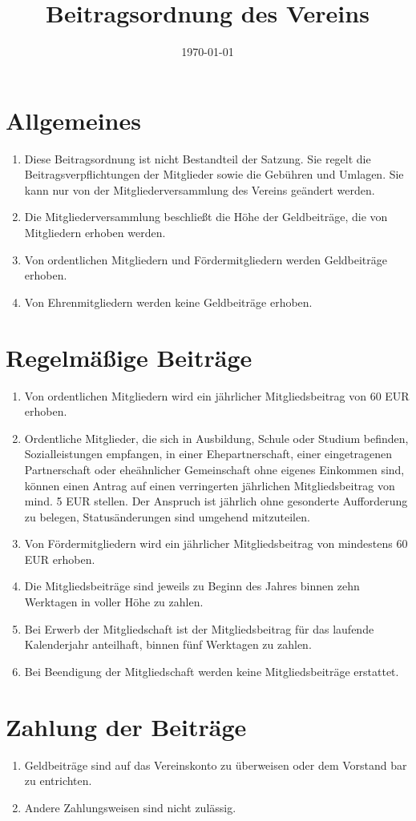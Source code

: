 \documentclass[12pt,a4paper,draft]{article}
\title{Beitragsordnung des Vereins \unsername}
\author{\unsername}
\date{\today}
\begin{document}
\maketitle
\tableofcontents

\section{Allgemeines}
\begin{enumerate}
\item Diese Beitragsordnung ist nicht Bestandteil der Satzung. Sie regelt die 
Beitragsverpflichtungen der Mitglieder sowie die Gebühren und Umlagen. Sie kann 
nur von der Mitgliederversammlung des Vereins geändert werden.

\item Die Mitgliederversammlung beschließt die Höhe der Geldbeiträge, die von 
Mitgliedern erhoben werden.

\item Von ordentlichen Mitgliedern und Fördermitgliedern werden Geldbeiträge 
erhoben.

\item Von Ehrenmitgliedern werden keine Geldbeiträge erhoben.
\end{enumerate}

\section{Regelmäßige Beiträge}
\begin{enumerate}
\item Von ordentlichen Mitgliedern wird ein jährlicher Mitgliedsbeitrag von 60 
EUR erhoben.

\item Ordentliche Mitglieder, die sich in Ausbildung, Schule oder Studium 
befinden, Sozialleistungen empfangen, in einer Ehepartnerschaft, einer 
eingetragenen Partnerschaft oder eheähnlicher Gemeinschaft ohne eigenes 
Einkommen sind, können einen Antrag auf einen verringerten jährlichen 
Mitgliedsbeitrag von mind. 5 EUR stellen. Der Anspruch ist jährlich ohne 
gesonderte Aufforderung zu belegen, Statusänderungen sind umgehend mitzuteilen.

\item Von Fördermitgliedern wird ein jährlicher Mitgliedsbeitrag von mindestens 
60 EUR erhoben.

\item Die Mitgliedsbeiträge sind jeweils zu Beginn des Jahres binnen zehn 
Werktagen in voller Höhe zu zahlen.

\item Bei Erwerb der Mitgliedschaft ist der Mitgliedsbeitrag für das laufende 
Kalenderjahr anteilhaft, binnen fünf Werktagen zu zahlen.

\item Bei Beendigung der Mitgliedschaft werden keine Mitgliedsbeiträge 
erstattet.
\end{enumerate}

\section{Zahlung der Beiträge}
\begin{enumerate}
\item Geldbeiträge sind auf das Vereinskonto zu überweisen oder dem Vorstand 
bar zu entrichten.

\item Andere Zahlungsweisen sind nicht zulässig.
\end{enumerate}
\end{document}
